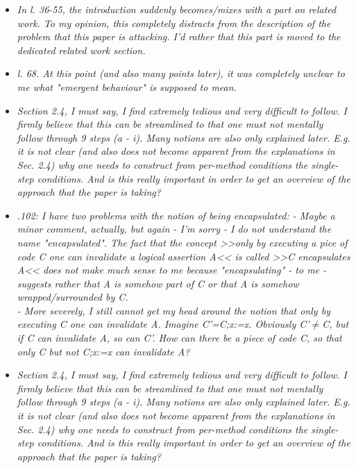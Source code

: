 \documentclass[11pt]{amsart}
\begin{document}
\begin{itemize}
\item
\emph{In l. 36-55, the introduction suddenly becomes/mixes with a part on related work. To my opinion, this completely distracts from the description of the problem that this paper is attacking. I'd rather that this part is moved to the dedicated related work section.}

\item
\emph{l. 68. At this point (and also many points later), it was completely unclear to me what "emergent behaviour" is supposed to mean. }

\item
\emph{
Section 2.4, I must say, I find extremely tedious and very difficult to follow. I firmly believe that this can be streamlined to that one must not mentally follow through 9 steps (a - i). Many notions are also only explained later. E.g. it is not clear (and also does not become apparent from the explanations in Sec. 2.4) why one needs to construct from per-method conditions the single-step conditions. And is this really important in order to get an overview of the approach that the paper is taking?
}

\item
\emph{
.102: I have two problems with the notion of being encapsulated:
   - Maybe a minor comment, actually, but again - I'm sorry - I do not understand the name "encapsulated". The fact that the concept >>only by executing a pice of code C one can invalidate a logical assertion A<< is called >>C encapsulates A<< does not make much sense to me because "encapsulating" - to me - suggests rather that A is somehow part of C or that A is somehow wrapped/surrounded by C.
   }\\
\emph{   
   - More severely, I still cannot get my head around the notion that only by executing C one can invalidate A. Imagine C'=C;x:=x. Obviously C'$\neq$C, but if C can invalidate A, so can C'. How can there be a piece of code C, so that only C but not C;x:=x can invalidate A?
}

\item
\emph{
Section 2.4, I must say, I find extremely tedious and very difficult to follow. I firmly believe that this can be streamlined to that one must not mentally follow through 9 steps (a - i). Many notions are also only explained later. E.g. it is not clear (and also does not become apparent from the explanations in Sec. 2.4) why one needs to construct from per-method conditions the single-step conditions. And is this really important in order to get an overview of the approach that the paper is taking?
}


\end{itemize}
\end{document}
